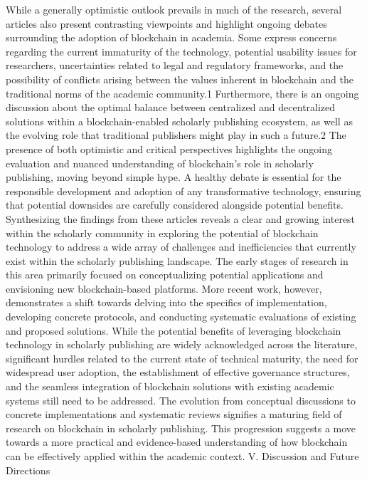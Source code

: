 \documentclass{article}
\begin{document}
While a generally optimistic outlook prevails in much of the research, several articles also present contrasting viewpoints and highlight ongoing debates surrounding the adoption of blockchain in academia. Some express concerns regarding the current immaturity of the technology, potential usability issues for researchers, uncertainties related to legal and regulatory frameworks, and the possibility of conflicts arising between the values inherent in blockchain and the traditional norms of the academic community.1 Furthermore, there is an ongoing discussion about the optimal balance between centralized and decentralized solutions within a blockchain-enabled scholarly publishing ecosystem, as well as the evolving role that traditional publishers might play in such a future.2 The presence of both optimistic and critical perspectives highlights the ongoing evaluation and nuanced understanding of blockchain's role in scholarly publishing, moving beyond simple hype. A healthy debate is essential for the responsible development and adoption of any transformative technology, ensuring that potential downsides are carefully considered alongside potential benefits.
Synthesizing the findings from these articles reveals a clear and growing interest within the scholarly community in exploring the potential of blockchain technology to address a wide array of challenges and inefficiencies that currently exist within the scholarly publishing landscape. The early stages of research in this area primarily focused on conceptualizing potential applications and envisioning new blockchain-based platforms. More recent work, however, demonstrates a shift towards delving into the specifics of implementation, developing concrete protocols, and conducting systematic evaluations of existing and proposed solutions. While the potential benefits of leveraging blockchain technology in scholarly publishing are widely acknowledged across the literature, significant hurdles related to the current state of technical maturity, the need for widespread user adoption, the establishment of effective governance structures, and the seamless integration of blockchain solutions with existing academic systems still need to be addressed. The evolution from conceptual discussions to concrete implementations and systematic reviews signifies a maturing field of research on blockchain in scholarly publishing. This progression suggests a move towards a more practical and evidence-based understanding of how blockchain can be effectively applied within the academic context.
V. Discussion and Future Directions
\end{document}
